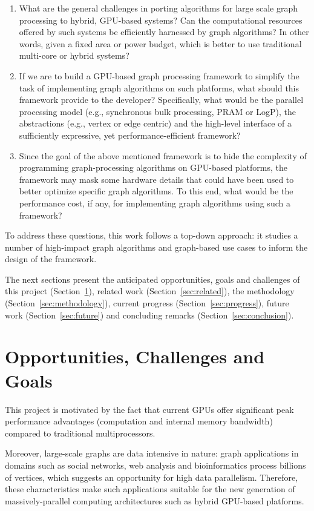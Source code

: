 \documentclass{acm_proc_article-sp}[12pt]
\begin{document}
\begin{enumerate}
  \item What are the general challenges in porting algorithms for large scale graph processing to hybrid, GPU-based systems? Can the computational resources offered by such systems be efficiently harnessed by graph algorithms? In other words, given a fixed area or power budget, which is better to use traditional multi-core or hybrid systems?

  \item If we are to build a GPU-based graph processing framework to simplify the task of implementing graph algorithms on such platforms, what should this framework provide to the developer? Specifically, what would be the parallel processing model (e.g., synchronous bulk processing, PRAM or LogP), the abstractions (e.g., vertex or edge centric) and the high-level interface of a sufficiently expressive, yet performance-efficient framework? 
  
  \item Since the goal of the above mentioned framework is to hide the complexity of programming graph-processing algorithms on GPU-based platforms, the framework may mask some hardware details that could have been used to better optimize specific graph algorithms. To this end, what would be the performance cost, if any, for implementing graph algorithms using such a framework? 
\end{enumerate}

To address these questions, this work follows a top-down approach: it studies a number of high-impact graph algorithms and graph-based use cases to inform the design of the framework.

The next sections present the anticipated opportunities, goals and challenges of this project (Section~\ref{sec:opp}), related work (Section~\ref{sec:related}), the methodology (Section~\ref{sec:methodology}), current progress (Section~\ref{sec:progress}), future work (Section~\ref{sec:future}) and concluding remarks (Section~\ref{sec:conclusion}).

\section{Opportunities, Challenges and Goals}
\label{sec:opp}
This project is motivated by the fact that current GPUs offer significant peak performance advantages (computation and internal memory bandwidth) compared to traditional multiprocessors. 

Moreover, large-scale graphs are data intensive in nature: graph applications in domains such as social networks, web analysis and bioinformatics process billions of vertices, which suggests an opportunity for high data parallelism. Therefore, these characteristics make such applications suitable for the new generation of massively-parallel computing architectures such as hybrid GPU-based platforms.
\end{document}
